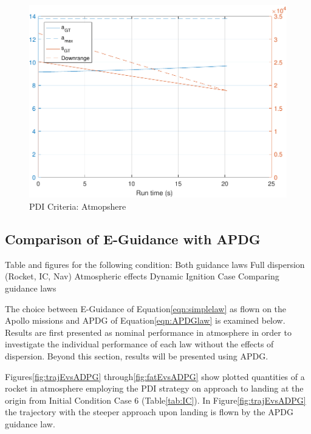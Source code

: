 \begin{figure}[H]
	\centering
	\begin{minipage}{4.5 in}
		\includegraphics[width=\linewidth]{Figures/gtcriteriaatmo.pdf}
		\caption{PDI Criteria: Atmopshere \label{fig:gtcriteriaatmo} }
	\end{minipage}
\end{figure}


\subsection{Comparison of E-Guidance with APDG}
Table and figures for the following condition:
Both guidance laws
Full dispersion (Rocket, IC, Nav)
Atmospheric effects
Dynamic Ignition Case
Comparing guidance laws

The choice between E-Guidance of Equation\:\ref{eqn:simplelaw} as flown on the Apollo missions and APDG of Equation\:\ref{eqn:APDGlaw} is examined below. Results are first presented as nominal performance in atmosphere in order to investigate the individual performance of each law without the effects of dispersion. Beyond this section, results will be presented using APDG.

Figures\:\ref{fig:trajEvsADPG} through\:\ref{fig:fatEvsADPG} show plotted quantities of a rocket in atmosphere employing the PDI strategy on approach to landing at the origin from Initial Condition Case 6 (Table\:\ref{tab:IC}). In Figure\:\ref{fig:trajEvsADPG} the trajectory with the steeper approach upon landing is flown by the APDG guidance law. 

